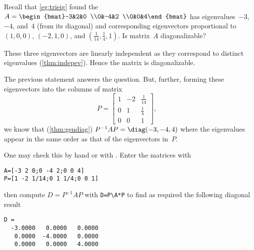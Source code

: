 \begin{example} \label{eg:trieigp}
Recall that \cref{eg:trieig} found the 
\(A=\begin{bmat}-3&2&0
\\0&-4&2
\\0&0&4\end{bmat}\)
has eigenvalues~\(-3\), \(-4\), and~\(4\) (from its diagonal) and corresponding eigenvectors proportional to \((1,0,0)\), \((-2,1,0)\), and \((\frac1{14},\frac14,1)\).
Is matrix~\(A\) diagonalizable?
\begin{solution} 
These three eigenvectors are linearly independent as they correspond to distinct eigenvalues (\cref{thm:indepev}).
Hence the matrix is diagonalizable.

The previous statement answers the question. 
But, further, forming these eigenvectors into the columns of matrix
\begin{equation*}
P=\begin{bmatrix} 1&-2&\frac1{14}
\\0&1&\frac14
\\0&0&1 \end{bmatrix},
\end{equation*}
we know that (\cref{thm:gendiag}) \(P^{-1}AP=\diag(-3,-4,4)\) where the eigenvalues appear in the same order as that of the eigenvectors in~\(P\).

One may check this by hand or with \script.
Enter the matrices with
\begin{verbatim}
A=[-3 2 0;0 -4 2;0 0 4]
P=[1 -2 1/14;0 1 1/4;0 0 1]
\end{verbatim}
\setbox\ajrqrbox\hbox{}\marginajrbox%
then compute \(D=P^{-1}AP\) with \verb|D=P\A*P| to find as required the following diagonal result
\begin{verbatim}
D =
  -3.0000   0.0000   0.0000
   0.0000  -4.0000   0.0000
   0.0000   0.0000   4.0000
\end{verbatim}
\end{solution}
\end{example}

